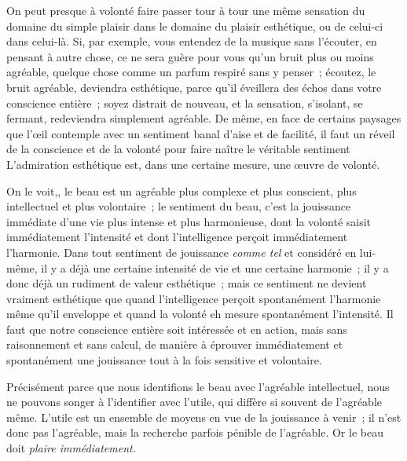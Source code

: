 \documentclass[french,twoside]{book} %
\begin{document}
On peut presque à volonté faire passer tour à tour une même sensation du domaine du simple plaisir dans le domaine du plaisir esthétique, ou de celui-ci dans celui-là. Si, par exemple, vous entendez de la musique sans l’écouter, en pensant à autre chose, ce ne sera guère pour vous qu’un bruit plus ou moins agréable, quelque chose comme un parfum respiré sans y penser ; écoutez, le bruit agréable, deviendra esthétique, parce qu’il éveillera des échos dans votre conscience entière ; soyez distrait de nouveau, et la sensation, s’isolant, se fermant, redeviendra simplement agréable. De même, en face de certains paysages que l’œil contemple avec un sentiment banal d’aise et de facilité, il faut un réveil de la conscience et de la volonté pour faire naître le véritable sentiment L’admiration esthétique est, dans une certaine mesure, une œuvre de volonté.\par
On le voit,, le beau est un agréable plus complexe et plus conscient, plus intellectuel et plus volontaire ; le sentiment du beau, c’est la jouissance immédiate d’une vie plus intense et plus harmonieuse, dont la volonté saisit immédiatement l’intensité et dont l’intelligence perçoit immédiatement l’harmonie. Dans tout sentiment de jouissance \emph{comme tel} et considéré en lui-même, il y a déjà une certaine intensité de vie et une certaine harmonie ; il y a donc déjà un rudiment de valeur esthétique ; mais ce sentiment ne devient vraiment esthétique que quand l’intelligence perçoit spontanément l’harmonie même qu’il enveloppe et quand la volonté eh mesure spontanément l’intensité. Il faut que notre conscience entière soit intéressée et en action, mais sans raisonnement et sans calcul, de manière à éprouver immédiatement et spontanément une jouissance tout à la fois sensitive et volontaire.\par
Précisément parce que nous identifions le beau avec l’agréable intellectuel, nous ne pouvons songer à l’identifier avec l’utile, qui diffère si souvent de l’agréable même. L’utile est un ensemble de moyens en vue de la jouissance à venir ; il n’est donc pas l’agréable, mais la recherche parfois pénible de l’agréable. Or le beau doit \emph{plaire immédiatement.}\par
\end{document}
